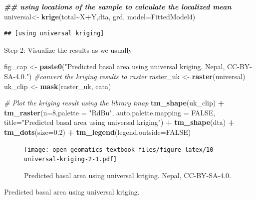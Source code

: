 \documentclass[
]{book}
\newenvironment{Shaded}{\begin{snugshade}}{\end{snugshade}}
\newcommand{\AttributeTok}[1]{\textcolor[rgb]{0.13,0.29,0.53}{#1}}
\newcommand{\CommentTok}[1]{\textcolor[rgb]{0.56,0.35,0.01}{\textit{#1}}}
\newcommand{\ConstantTok}[1]{\textcolor[rgb]{0.56,0.35,0.01}{#1}}
\newcommand{\DecValTok}[1]{\textcolor[rgb]{0.00,0.00,0.81}{#1}}
\newcommand{\DocumentationTok}[1]{\textcolor[rgb]{0.56,0.35,0.01}{\textbf{\textit{#1}}}}
\newcommand{\FloatTok}[1]{\textcolor[rgb]{0.00,0.00,0.81}{#1}}
\newcommand{\FunctionTok}[1]{\textcolor[rgb]{0.13,0.29,0.53}{\textbf{#1}}}
\newcommand{\NormalTok}[1]{#1}
\newcommand{\OtherTok}[1]{\textcolor[rgb]{0.56,0.35,0.01}{#1}}
\newcommand{\SpecialCharTok}[1]{\textcolor[rgb]{0.81,0.36,0.00}{\textbf{#1}}}
\newcommand{\StringTok}[1]{\textcolor[rgb]{0.31,0.60,0.02}{#1}}
\begin{document}
\begin{Shaded}
\begin{Highlighting}[]
\DocumentationTok{\#\# using locations of the sample to calculate the localized mean}
\NormalTok{universal}\OtherTok{\textless{}{-}} \FunctionTok{krige}\NormalTok{(total}\SpecialCharTok{\textasciitilde{}}\NormalTok{X}\SpecialCharTok{+}\NormalTok{Y,dta, grd, }\AttributeTok{model=}\NormalTok{FittedModel4)}
\end{Highlighting}
\end{Shaded}

\begin{verbatim}
## [using universal kriging]
\end{verbatim}

Step 2: Visualize the results as we usually

\begin{Shaded}
\begin{Highlighting}[]
\NormalTok{fig\_cap }\OtherTok{\textless{}{-}} \FunctionTok{paste0}\NormalTok{(}\StringTok{"Predicted basal area using universal kriging. Nepal, CC{-}BY{-}SA{-}4.0."}\NormalTok{)}
\CommentTok{\#convert the kriging results to raster}
\NormalTok{raster\_uk      }\OtherTok{\textless{}{-}} \FunctionTok{raster}\NormalTok{(universal)}
\NormalTok{uk\_clip    }\OtherTok{\textless{}{-}} \FunctionTok{mask}\NormalTok{(raster\_uk, cata)}

\CommentTok{\# Plot the kriging result using the library tmap}
\FunctionTok{tm\_shape}\NormalTok{(uk\_clip) }\SpecialCharTok{+} 
  \FunctionTok{tm\_raster}\NormalTok{(}\AttributeTok{n=}\DecValTok{8}\NormalTok{,}\AttributeTok{palette =} \StringTok{"RdBu"}\NormalTok{, }\AttributeTok{auto.palette.mapping =} \ConstantTok{FALSE}\NormalTok{,}
            \AttributeTok{title=}\StringTok{"Predicted basal area using universal kriging"}\NormalTok{) }\SpecialCharTok{+} 
  \FunctionTok{tm\_shape}\NormalTok{(dta) }\SpecialCharTok{+} \FunctionTok{tm\_dots}\NormalTok{(}\AttributeTok{size=}\FloatTok{0.2}\NormalTok{) }\SpecialCharTok{+}
  \FunctionTok{tm\_legend}\NormalTok{(}\AttributeTok{legend.outside=}\ConstantTok{FALSE}\NormalTok{)}
\end{Highlighting}
\end{Shaded}

\begin{figure}
\centering
\texttt{[image: open-geomatics-textbook\_files/figure-latex/10-universal-kriging-2-1.pdf]}
\caption{\label{fig:10-universal-kriging-2}Predicted basal area using universal kriging. Nepal, CC-BY-SA-4.0.}
\end{figure}

Predicted basal area using universal kriging.
\end{document}
